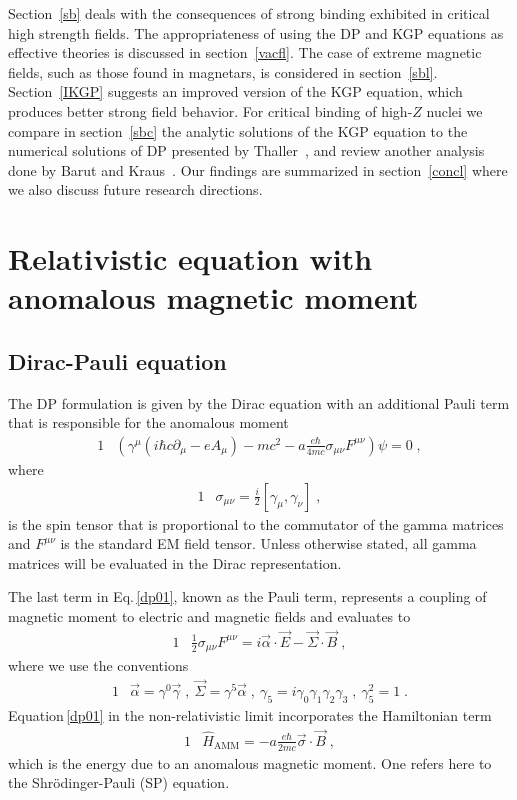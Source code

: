 \documentclass[epj]{svjour}
\begin{document}
Section~\ref{sb} deals with the consequences of strong binding exhibited in critical high strength fields. The appropriateness of using the DP and KGP equations as effective theories is discussed in section~\ref{vacfl}. The case of extreme magnetic fields, such as those found in magnetars, is considered in section~\ref{sbl}. Section~\ref{IKGP} suggests an improved version of the KGP equation, which produces better strong field behavior. For critical binding of high-$Z$ nuclei we compare in section~\ref{sbc} the analytic solutions of the KGP equation to the numerical solutions of DP presented by Thaller~\cite{Thaller:1992ji}, and review another analysis done by Barut and Kraus~\cite{Barut:1975hz,Barut:1976hs}. Our findings are summarized in section~\ref{concl} where we also discuss future research directions.

\section{Relativistic equation with anomalous magnetic moment}\label{RQMg}
\subsection{Dirac-Pauli equation} \label{dp}
The DP formulation is given by the Dirac equation with an additional Pauli term that is responsible for the anomalous moment
\begin{alignat}{1}
\label{dp01} &\left(\gamma^{\mu}\left(i\hbar c\partial_{\mu}-eA_{\mu}\right)-mc^{2}-a\frac{e\hbar}{4mc}\sigma_{\mu\nu}F^{\mu\nu}\right)\psi=0\;,
\end{alignat}
where\\[-1.2cm]
\begin{alignat}{1}
\label{dp02} &\sigma_{\mu\nu}=\frac{i}{2}[\gamma_{\mu},\gamma_{\nu}]
\;,\end{alignat}
is the spin tensor that is proportional to the commutator of the gamma matrices and $F^{\mu\nu}$ is the standard EM field tensor. Unless otherwise stated, all gamma matrices will be evaluated in the Dirac representation. 

The last term in Eq.\,\eqref{dp01}, known as the Pauli term, represents a coupling of magnetic moment to electric and magnetic fields and evaluates to
\begin{alignat}{1}
\label{dp03} &\frac{1}{2} \sigma_{\mu\nu}F^{\mu\nu} =i\vec{\alpha}\cdot\vec{E}-\vec{\Sigma}\cdot\vec{B}\;,
\end{alignat}
where we use the conventions
\begin{alignat}{1}
\label{dp04} & 
 \vec{\alpha}=\gamma^{0}\vec{\gamma}\;,\ 
 \vec{\Sigma}=\gamma^{5} \vec{\alpha}\;, \ 
 \gamma_5=i\gamma_0\gamma_1\gamma_2\gamma_3\;, \ 
 \gamma_5^2=1 \;.
\end{alignat} 
Equation\,\eqref{dp01} in the non-relativistic limit incorporates the Hamiltonian term
\begin{alignat}{1}
\label{dp06} &\hat{H}_{\mathrm{AMM}}=-a\frac{e\hbar}{2mc}\vec{\sigma}\cdot\vec{B}\;,\end{alignat}
which is the energy due to an anomalous magnetic moment. One refers here to the Shr\"{o}dinger-Pauli (SP) equation.
\end{document}
